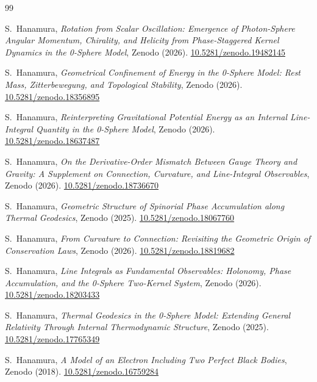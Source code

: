 \documentclass[%
 reprint, amsmath,amssymb, aps, prb, ]{revtex4-2}
\numberwithin{equation}{section}
\begin{document}
\begin{thebibliography}{99}

S.~Hanamura, \textit{Rotation from Scalar Oscillation: Emergence of Photon-Sphere Angular Momentum, Chirality, and Helicity from Phase-Staggered Kernel Dynamics in the 0-Sphere Model}, Zenodo (2026). \href{https://doi.org/10.5281/zenodo.19482145}{10.5281/zenodo.19482145}

S.~Hanamura, \textit{Geometrical Confinement of Energy in the 0-Sphere Model: Rest Mass, Zitterbewegung, and Topological Stability}, Zenodo (2026). \href{https://doi.org/10.5281/zenodo.18356895}{10.5281/zenodo.18356895}

S.~Hanamura, \textit{Reinterpreting Gravitational Potential Energy as an Internal Line-Integral Quantity in the 0-Sphere Model}, Zenodo (2026). \href{https://doi.org/10.5281/zenodo.18637487}{10.5281/zenodo.18637487}

S.~Hanamura, \textit{On the Derivative-Order Mismatch Between Gauge Theory and Gravity: A Supplement on Connection, Curvature, and Line-Integral Observables}, Zenodo (2026). \href{https://doi.org/10.5281/zenodo.18736670}{10.5281/zenodo.18736670}

S.~Hanamura, \textit{Geometric Structure of Spinorial Phase Accumulation along Thermal Geodesics}, Zenodo (2025). \href{https://doi.org/10.5281/zenodo.18067760}{10.5281/zenodo.18067760}

S.~Hanamura, \textit{From Curvature to Connection: Revisiting the Geometric Origin of Conservation Laws}, Zenodo (2026). \href{https://doi.org/10.5281/zenodo.18819682}{10.5281/zenodo.18819682}

S.~Hanamura, \textit{Line Integrals as Fundamental Observables: Holonomy, Phase Accumulation, and the 0-Sphere Two-Kernel System}, Zenodo (2026). \href{https://doi.org/10.5281/zenodo.18203433}{10.5281/zenodo.18203433}

S.~Hanamura, \textit{Thermal Geodesics in the 0-Sphere Model: Extending General Relativity Through Internal Thermodynamic Structure}, Zenodo (2025). \href{https://doi.org/10.5281/zenodo.17765349}{10.5281/zenodo.17765349}

S.~Hanamura, \textit{A Model of an Electron Including Two Perfect Black Bodies}, Zenodo (2018). \href{https://doi.org/10.5281/zenodo.16759284}{10.5281/zenodo.16759284}


\end{thebibliography}
\end{document}
